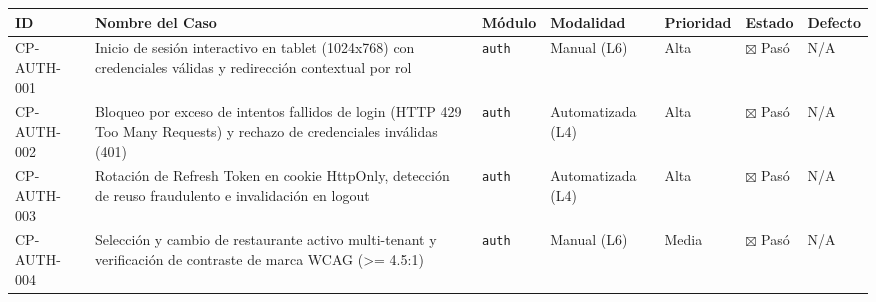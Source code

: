\documentclass[10pt,a4paper]{article}
\newcounter{none}
\begin{document}
{\def\LTcaptype{none} %
\begin{longtable}[]{@{}
  >{\raggedright\arraybackslash}p{}
  >{\raggedright\arraybackslash}p{}
  >{\raggedright\arraybackslash}p{}
  >{\raggedright\arraybackslash}p{}
  >{\raggedright\arraybackslash}p{}
  >{\raggedright\arraybackslash}p{}
  >{\raggedright\arraybackslash}p{}@{}}
\toprule\noalign{}
\begin{minipage}[b]{\linewidth}\raggedright
ID
\end{minipage} & \begin{minipage}[b]{\linewidth}\raggedright
Nombre del Caso
\end{minipage} & \begin{minipage}[b]{\linewidth}\raggedright
Módulo
\end{minipage} & \begin{minipage}[b]{\linewidth}\raggedright
Modalidad
\end{minipage} & \begin{minipage}[b]{\linewidth}\raggedright
Prioridad
\end{minipage} & \begin{minipage}[b]{\linewidth}\raggedright
Estado
\end{minipage} & \begin{minipage}[b]{\linewidth}\raggedright
Defecto
\end{minipage} \\
\midrule\noalign{}
\endhead
\bottomrule\noalign{}
\endlastfoot
CP-AUTH-001 & Inicio de sesión interactivo en tablet (1024x768) con credenciales válidas y redirección contextual por rol & \texttt{auth} & Manual (L6) & Alta & \ensuremath{\boxtimes} Pasó & N/A \\
CP-AUTH-002 & Bloqueo por exceso de intentos fallidos de login (HTTP 429 Too Many Requests) y rechazo de credenciales inválidas (401) & \texttt{auth} & Automatizada (L4) & Alta & \ensuremath{\boxtimes} Pasó & N/A \\
CP-AUTH-003 & Rotación de Refresh Token en cookie HttpOnly, detección de reuso fraudulento e invalidación en logout & \texttt{auth} & Automatizada (L4) & Alta & \ensuremath{\boxtimes} Pasó & N/A \\
CP-AUTH-004 & Selección y cambio de restaurante activo multi-tenant y verificación de contraste de marca WCAG (\textgreater= 4.5:1) & \texttt{auth} & Manual (L6) & Media & \ensuremath{\boxtimes} Pasó & N/A \\

\end{longtable}}
\end{document}
